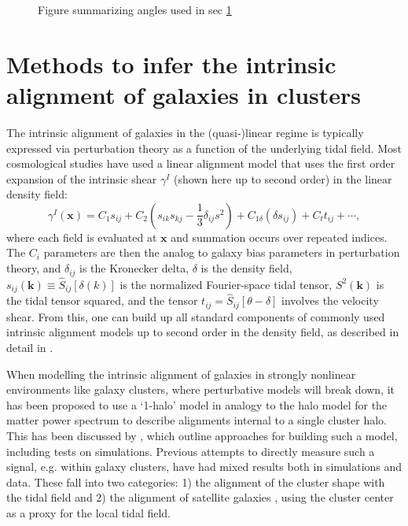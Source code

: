 \documentclass[fleqn,usenatbib]{mnras}
\begin{document}
\begin{figure}
\begin{center}
\end{center}
\caption[]{Figure summarizing angles used in sec \ref{methods}
\label{fig:phisat}}
\end{figure}

\section{Methods to infer the intrinsic alignment of galaxies in clusters}\label{methods}

The intrinsic alignment of galaxies in the (quasi-)linear regime is typically expressed via perturbation theory as a function of the underlying tidal field. Most cosmological studies have used a linear alignment model \cite{} that uses the first order expansion of the intrinsic shear $\gamma^I$ (shown here up to second order) in the linear density field:
\begin{equation}
    \gamma^I(\bm{x}) = C_1 s_{ij}+C_2\left(s_{ik}s_{kj}-\frac{1}{3}\delta_{ij}s^2\right)+C_{1\delta}(\delta s_{ij})+C_t t_{ij}+\cdots,
\end{equation}
where each field is evaluated at $\bm{x}$ and summation occurs over repeated indices. The $C_i$ parameters are then the analog to galaxy bias parameters in perturbation theory, and $\delta_{ij}$ is the Kronecker delta, $\delta$ is the density field, $s_{ij}(\bm{k})\equiv\hat{S}_{ij}[\delta(k)]$ is the normalized Fourier-space tidal tensor, $S^2(\bm{k})$ is the tidal tensor squared, and the tensor $t_{ij}=\hat{S}_{ij}[\theta-\delta]$ involves the velocity shear. From this, one can build up all standard components of commonly used intrinsic alignment models up to second order in the density field, as described in detail in \cite{blazek}.

When modelling the intrinsic alignment of galaxies in strongly nonlinear environments like galaxy clusters, where perturbative models will break down, it has been proposed to use a `1-halo' model in analogy to the halo model for the matter power spectrum to describe alignments internal to a single cluster halo. This has been discussed by \cite{SB10, 2003.02700}, which outline approaches for building such a model, including tests on simulations. Previous attempts to directly measure such a signal, e.g. within galaxy clusters, have had mixed results both in simulations and data. These fall into two categories: 1) the alignment of the cluster shape with the tidal field \cite{} and 2) the alignment of satellite galaxies \cite{}, using the cluster center as a proxy for the local tidal field. 
\end{document}
